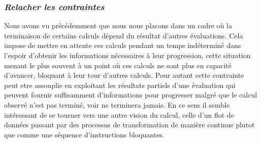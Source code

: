 \documentclass[9pt]{article}
\begin{document}
\begin{center}
  \subsubsection*{\textit{Relacher les contraintes}}
\end{center}

Nous avons vu précédemment que nous nous placons dans un cadre où la terminaison de certains calculs
dépend du résultat d'autres évaluations. Cela impose de mettre en attente ces calculs pendant un temps indéterminé dans l'espoir
d'obtenir les informations nécessaires à leur progression, cette situation menant le plus souvent à un point où ces calculs ne
sont plus en capacité d'avancer, bloquant à leur tour d'autres calculs. Pour autant cette contrainte peut etre
assouplie en exploitant les résultats partiels d'une évaluation qui peuvent fournir suffisamment d'informations pour
progresser malgré que le calcul observé n'est pas terminé, voir ne terminera jamais. En ce sens il semble intéressant de se tourner
vers une autre vision du calcul, celle d'un flot de données passant par des processus de transformation de manière continue plutot que
comme une séquence d'instructions bloquantes.
\end{document}
